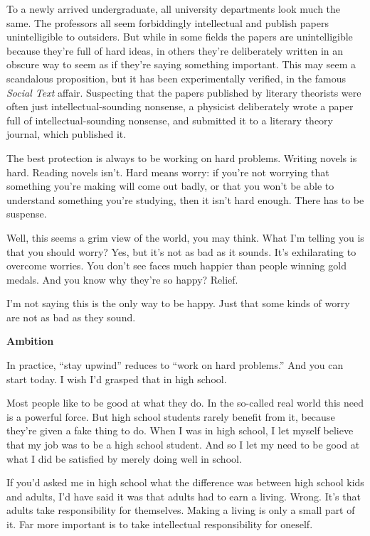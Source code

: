 \documentclass[12pt]{book}
\begin{document}
To a newly arrived undergraduate, all university departments look much
the same. The professors all seem forbiddingly intellectual and publish
papers unintelligible to outsiders. But while in some fields the papers
are unintelligible because they're full of hard ideas, in others they're
deliberately written in an obscure way to seem as if they're saying
something important. This may seem a scandalous proposition, but it has
been experimentally verified, in the famous \emph{Social Text} affair.
Suspecting that the papers published by literary theorists were often
just intellectual-sounding nonsense, a physicist deliberately wrote a
paper full of intellectual-sounding nonsense, and submitted it to a
literary theory journal, which published it.

The best protection is always to be working on hard problems. Writing
novels is hard. Reading novels isn't. Hard means worry: if you're not
worrying that something you're making will come out badly, or that you
won't be able to understand something you're studying, then it isn't
hard enough. There has to be suspense.

Well, this seems a grim view of the world, you may think. What I'm
telling you is that you should worry? Yes, but it's not as bad as it
sounds. It's exhilarating to overcome worries. You don't see faces much
happier than people winning gold medals. And you know why they're so
happy? Relief.

I'm not saying this is the only way to be happy. Just that some kinds of
worry are not as bad as they sound.

\textbf{Ambition}

In practice, ``stay upwind'' reduces to ``work on hard problems.'' And
you can start today. I wish I'd grasped that in high school.

Most people like to be good at what they do. In the so-called real world
this need is a powerful force. But high school students rarely benefit
from it, because they're given a fake thing to do. When I was in high
school, I let myself believe that my job was to be a high school
student. And so I let my need to be good at what I did be satisfied by
merely doing well in school.

If you'd asked me in high school what the difference was between high
school kids and adults, I'd have said it was that adults had to earn a
living. Wrong. It's that adults take responsibility for themselves.
Making a living is only a small part of it. Far more important is to
take intellectual responsibility for oneself.
\end{document}
